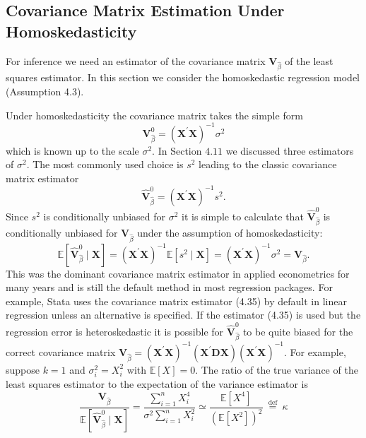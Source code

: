 \documentclass[10pt]{article}
\begin{document}
\subsection{Covariance Matrix Estimation Under Homoskedasticity}
For inference we need an estimator of the covariance matrix $\boldsymbol{V}_{\widehat{\beta}}$ of the least squares estimator. In this section we consider the homoskedastic regression model (Assumption 4.3).

Under homoskedasticity the covariance matrix takes the simple form
$$
\boldsymbol{V}_{\widehat{\beta}}^{0}=\left(\boldsymbol{X}^{\prime} \boldsymbol{X}\right)^{-1} \sigma^{2}
$$
which is known up to the scale $\sigma^{2}$. In Section $4.11$ we discussed three estimators of $\sigma^{2}$. The most commonly used choice is $s^{2}$ leading to the classic covariance matrix estimator
$$
\widehat{\boldsymbol{V}}_{\widehat{\beta}}^{0}=\left(\boldsymbol{X}^{\prime} \boldsymbol{X}\right)^{-1} s^{2} .
$$
Since $s^{2}$ is conditionally unbiased for $\sigma^{2}$ it is simple to calculate that $\widehat{\boldsymbol{V}}_{\widehat{\beta}}^{0}$ is conditionally unbiased for $\boldsymbol{V}_{\widehat{\beta}}$ under the assumption of homoskedasticity:
$$
\mathbb{E}\left[\widehat{\boldsymbol{V}}_{\widehat{\beta}}^{0} \mid \boldsymbol{X}\right]=\left(\boldsymbol{X}^{\prime} \boldsymbol{X}\right)^{-1} \mathbb{E}\left[s^{2} \mid \boldsymbol{X}\right]=\left(\boldsymbol{X}^{\prime} \boldsymbol{X}\right)^{-1} \sigma^{2}=\boldsymbol{V}_{\widehat{\beta}} .
$$
This was the dominant covariance matrix estimator in applied econometrics for many years and is still the default method in most regression packages. For example, Stata uses the covariance matrix estimator (4.35) by default in linear regression unless an alternative is specified. If the estimator (4.35) is used but the regression error is heteroskedastic it is possible for $\widehat{\boldsymbol{V}}_{\widehat{\beta}}^{0}$ to be quite biased for the correct covariance matrix $\boldsymbol{V}_{\widehat{\beta}}=\left(\boldsymbol{X}^{\prime} \boldsymbol{X}\right)^{-1}\left(\boldsymbol{X}^{\prime} \boldsymbol{D} \boldsymbol{X}\right)\left(\boldsymbol{X}^{\prime} \boldsymbol{X}\right)^{-1}$. For example, suppose $k=1$ and $\sigma_{i}^{2}=X_{i}^{2}$ with $\mathbb{E}[X]=0$. The ratio of the true variance of the least squares estimator to the expectation of the variance estimator is
$$
\frac{\boldsymbol{V}_{\widehat{\beta}}}{\mathbb{E}\left[\widehat{\boldsymbol{V}}_{\widehat{\beta}}^{0} \mid \boldsymbol{X}\right]}=\frac{\sum_{i=1}^{n} X_{i}^{4}}{\sigma^{2} \sum_{i=1}^{n} X_{i}^{2}} \simeq \frac{\mathbb{E}\left[X^{4}\right]}{\left(\mathbb{E}\left[X^{2}\right]\right)^{2}} \stackrel{\text { def }}{=} \kappa
$$
\end{document}
